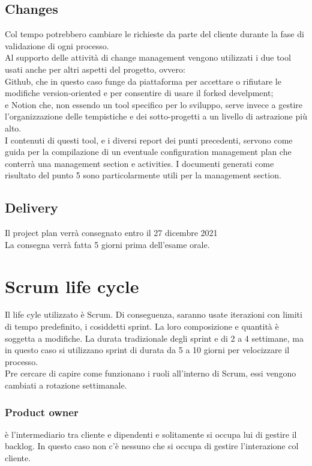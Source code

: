 \documentclass{article}
\begin{document}
\subsection{Changes}
Col tempo potrebbero cambiare le richieste da parte del cliente durante la fase di validazione di ogni processo.
\\Al supporto delle attività di change management vengono utilizzati i due tool usati anche per altri aspetti del progetto, ovvero: 
\\Github, che in questo caso funge da piattaforma per accettare o rifiutare le modifiche version-oriented e per consentire di usare il forked develpment; 
\\e Notion che, non essendo un tool specifico per lo sviluppo, serve invece a gestire l’organizzazione delle tempistiche e dei sotto-progetti a un livello di astrazione più alto.
\\I contenuti di questi tool, e i diversi report dei punti precedenti, servono come guida per la compilazione di un eventuale configuration management plan che conterrà una management section e activities. I documenti generati come risultato del punto 5 sono particolarmente utili per la management section.

\subsection{Delivery}
Il project plan verrà consegnato entro il 27 dicembre 2021
\\La consegna verrà fatta 5 giorni prima dell'esame orale.
\newpage
\section{Scrum life cycle}
Il life cyle utilizzato è Scrum. Di conseguenza, saranno usate iterazioni con limiti di tempo predefinito, i cosiddetti sprint. La loro composizione e quantità è soggetta a modifiche.
La durata tradizionale degli sprint e di 2 a 4 settimane, ma in questo caso si utilizzano sprint di durata da 5 a 10 giorni per velocizzare il processo.
\\Pre cercare di capire come funzionano i ruoli all'interno di Scrum, essi vengono cambiati a rotazione settimanale.

\subsubsection{Product owner} è l'intermediario tra cliente e dipendenti e solitamente si occupa lui di gestire il backlog. In questo 
caso non c'è nessuno che si occupa di gestire l'interazione col cliente.
\end{document}

